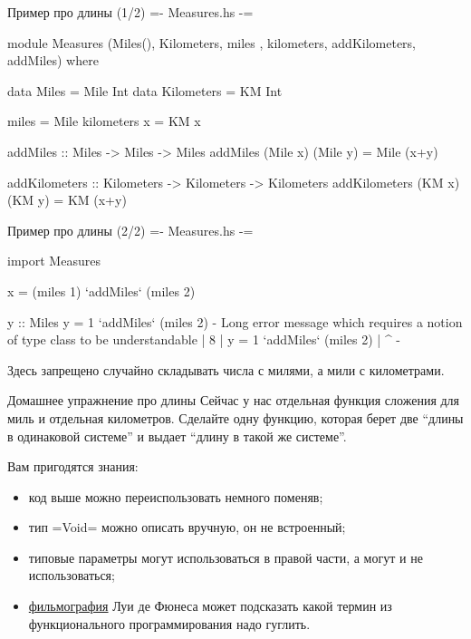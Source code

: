 \documentclass[
  xcolor={svgnames},
  hyperref={colorlinks,citecolor=DeepPink4,linkcolor=DarkRed,urlcolor=DarkBlue}]{beamer}
\begin{document}
\begin{frame}[fragile]{Пример про длины (1/2)}
\hsinline={- Measures.hs -}=
\begin{verbnobox}[\monacoB]
module Measures (Miles(), Kilometers, miles
  , kilometers, addKilometers, addMiles) where

data Miles = Mile Int
data Kilometers = KM Int
\end{verbnobox}
\begin{verbnobox}[\monacoB]
miles = Mile
kilometers x = KM x
\end{verbnobox}
\begin{verbnobox}[\monacoB]
addMiles :: Miles -> Miles -> Miles 
addMiles (Mile x) (Mile y) = Mile (x+y)
\end{verbnobox}
\begin{verbnobox}[\monacoB]
addKilometers :: Kilometers -> Kilometers -> 
                 Kilometers
addKilometers (KM x) (KM y) = KM (x+y)
\end{verbnobox}
\end{frame}

\begin{frame}[fragile]{Пример про длины (2/2) }
\hsinline={- Measures.hs -}=
\begin{verbnobox}[\monacoB]
import Measures

x = (miles 1) `addMiles` (miles 2)
\end{verbnobox}
\pause
\begin{verbnobox}[\monacoB]
y :: Miles
y = 1 `addMiles` (miles 2)
{-
  Long error message which requires a notion of 
  type class to be understandable
  |              
8 | y = 1 `addMiles` (miles 2)
  |     ^
-}
\end{verbnobox}
Здесь запрещено случайно складывать числа с милями, а мили с километрами.
\end{frame}

\begin{frame}[fragile]{Домашнее упражнение про длины}
Сейчас у нас отдельная функция сложения для миль и отдельная километров. Сделайте одну функцию, которая берет две ``длины в одинаковой системе'' и выдает ``длину в такой же системе''.
\vspace{1cm}

Вам пригодятся знания:
\begin{itemize}
 \item код выше можно переиспользовать немного поменяв;
 \item тип \hsinline=Void= можно описать вручную, он не встроенный;
 \item типовые параметры могут использоваться в правой части, а могут и не использоваться;
 \item \href{https://www.kinopoisk.ru/name/204813/}{фильмография} Луи де Фюнеса может подсказать какой термин из функционального программирования надо гуглить.
\end{itemize}
\end{frame}
\end{document}
